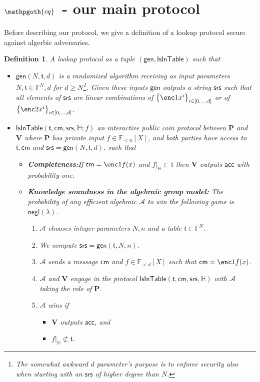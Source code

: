 \documentclass[11pt]{article} %
\newcommand{\cq}{\ensuremath{\mathpgoth{cq} }\xspace}
\newcommand{\F}{\ensuremath{\mathbb F}\xspace}
\newcommand{\adv}{\ensuremath{\mathcal A}\xspace}
\newcommand{\srs}{\ensuremath{\mathsf{srs}}\xspace}
\newcommand{\cm}{\ensuremath{\mathsf{cm}}\xspace}
\newcommand{\negl}{\ensuremath{\mathsf{negl}(\lambda)}\xspace}
\newcommand{\acc}{\ensuremath{\mathsf{acc}}\xspace}
\newcommand{\sett}[2]{\ensuremath{\set{#1}_{#2}}\xspace}
\newcommand{\gen}{\ensuremath{\mathsf{gen}}\xspace}
\newcommand{\prv}{\ensuremath{\mathsf{\mathbf{P}}}\xspace}
\newcommand{\ver}{\ensuremath{\mathsf{\mathbf{V}}}\xspace}
\newcommand{\set}[1]{\ensuremath{\left\{#1\right\}}\xspace}
\newcommand{\polysofdeg}[1]{\ensuremath{\F_{< #1}[X]}\xspace}
\newtheorem{dfn}[lemma]{Definition}
\newcommand{\restricttoset}[2]{\ensuremath{#1|_{#2}}\xspace}
\newcommand{\isintable}{\ensuremath{\mathsf{IsInTable}}\xspace}
\newcommand{\subspace}{\ensuremath{\mathbb{H}}\xspace}
\newcommand{\witsize}{\ensuremath{n}\xspace}
\newcommand{\tabsize}{\ensuremath{N}\xspace}
\newcommand{\tab}{\ensuremath{\mathfrak{t}}\xspace}
\begin{document}
\section{$\cq\;$ - our main protocol}
Before describing our protocol, we give a definition of a lookup protocol secure against algerbic adversaries.
\begin{dfn}\label{dfn:lookupprot}
A lookup protocol as a tuple $(\gen,\isintable)$ such that
\begin{itemize}
 \item $\gen(\tabsize,\tab,d)$ is a randomized algorithm receiving as input parameters $\tabsize,\tab\in \F^\tabsize,d$ for $d\geq \tabsize$\footnote{The somewhat awkward $d$ parameter's purpose is to enforce security also when starting with an \srs of higher degree than \tabsize.}.
 Given these inputs \gen outputs a string \srs such that all elements of \srs are linear combinations of \sett{\enc1{x^i}}{i\in[0,\ldots,d]} or
 of \sett{\enc2{x^i}}{i\in[0,\ldots,d]}.
 \item $\isintable(\tab,\cm,\srs,\subspace;f)$ an interactive public coin protocol between \prv and \ver where \prv has private input $f\in \polysofdeg{\witsize}$, and both parties have access to $\tab,\cm$ and  $\srs=\gen(\tabsize,\tab,d)$.
 such that
 \begin{itemize}
  \item \textbf{Completeness:}If $\cm=\enc1{f(x)}$ and $\restricttoset{f}{\subspace}\subset \tab$ then \ver outputs \acc with probability one.
  \item \textbf{Knowledge soundness in the algebraic group model:}
    The probability of any efficient algebraic \adv to win the following game is \negl.

\begin{enumerate}
\item \adv chooses integer parameters $\tabsize,\witsize$ and a table $\tab\in \F^\tabsize$.
 \item We compute $\srs=\gen(\tab,\tabsize,\witsize)$.
 \item \adv sends a message \cm and $f\in\polysofdeg{d}$ such that $\cm=\enc1{f(x)}$.
 \item \adv and \ver engage in the protocol $\isintable(\tab,\cm,\srs,\subspace)$ with \adv taking the role of \prv.
 \item \adv wins if 
 \begin{itemize}
  \item \ver outputs \acc, and
  \item $\restricttoset{f}{\subspace}\not\subset \tab$.
 \end{itemize}

\end{enumerate}
\end{itemize}
\end{itemize}
\end{dfn}
\end{document}
